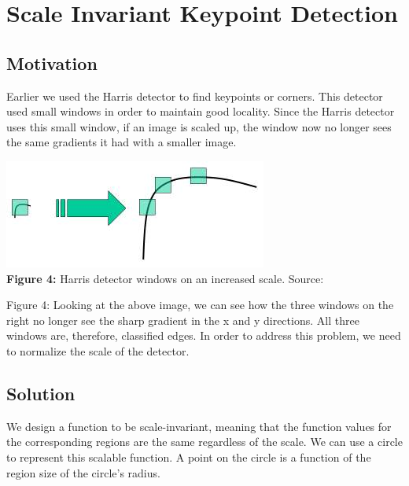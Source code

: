\documentclass{article}
\begin{document}
\section{Scale Invariant Keypoint Detection}
\subsection{Motivation}
Earlier we used the Harris detector to find keypoints or corners. This detector used small windows in order to maintain good locality. Since the Harris detector uses this small window, if an image is scaled up, the window now no longer sees the same gradients it had with a smaller image.\\
\begin{center}
	\includegraphics{sift_scale_invariant.jpg} \\
    \textbf{Figure 4:} Harris detector windows on an increased scale. Source: \cite{opencv}
\end{center}
Figure 4:
Looking at the above image, we can see how the three windows on the right no longer see the sharp gradient in the x and y directions. All three windows are, therefore, classified edges. In order to address this problem, we need to normalize the scale of the detector.
\subsection{Solution}
We design a function to be scale-invariant, meaning that the function values for the corresponding regions are the same regardless of the scale. We can use a circle to represent this scalable function. A point on the circle is a function of the region size of the circle's radius.
\end{document}
